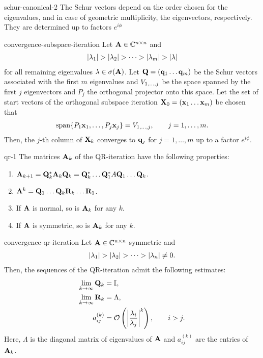 \begin{Lemma}{schur-canonical-2}
  The Schur vectors depend on the order chosen for the eigenvalues,
  and in case of geometric multiplicity, the eigenvectors,
  respectively. They are determined up to factors $e^{i\phi}$
\end{Lemma}

\begin{Theorem}{convergence-subspace-iteration}
  Let $\mata\in\Cnn$ and
  \begin{gather}
    \abs{\lambda_1} >
    \abs{\lambda_2}>\dots>\abs{\lambda_m}>\abs{\lambda}
  \end{gather}
  for all
  remaining eigenvalues $\lambda\in\sigma(\mata)$. Let
  $\matq = (\vq_1\dots\vq_m)$ be the Schur vectors associated with the
  first $m$ eigenvalues and $\esp{1,\dots,j}$ be the space spanned by
  the first $j$ eigenvectors and $P_j$ the orthogonal projector
  onto this space. Let the set of start vectors of the orthogonal subspace iteration
  $\matx_0 = (\vx_1\dots\vx_m)$ be chosen that
  \begin{gather}
    \operatorname{span}\{P_1 \vx_1,\dots,P_j\vx_j\} = \esp{1,\dots,j},\qquad j=1,\dots,m.
  \end{gather}
  Then, the $j$-th column of $\matx_k$ converges to $\vq_j$ for $j=1,\dots,m$ up to a factor $e^{i\phi}$.
\end{Theorem}

\begin{Lemma}{qr-1}
  The matrices $\mata_k$ of the QR-iteration have the following properties:
  \begin{enumerate}
  \item $\mata_{k+1} = \matq_k^*\mata_k\matq_k = \matq_k^*\dots\matq_1^*A\matq_1\dots\matq_k$.
  \item $\mata^k=\matq_1\dots\matq_k\matr_k\dots\matr_1$.
  \item If $\mata$ is normal, so is $\mata_k$ for any $k$.
  \item If $\mata$ is symmetric, so is $\mata_k$ for any $k$.
  \end{enumerate}
\end{Lemma}

\begin{Theorem}{convergence-qr-iteration}
  Let $\mata\in\Cnn$ symmetric and
  \begin{gather}
    \abs{\lambda_1} >
    \abs{\lambda_2}>\dots>\abs{\lambda_n} \neq 0.
  \end{gather}
  Then, the sequences of the QR-iteration admit the following estimates:
  \begin{align}
    \lim_{k\to\infty} \matq_k &= \id,\\
    \lim_{k\to\infty} \matr_k &= \Lambda,\\
    a_{ij}^{(k)} &= \bigo \left(\abs*{\frac{\lambda_i}{\lambda_j}}^k\right),
                   \qquad i>j.
  \end{align}
  Here, $\Lambda$ is the diagonal matrix of eigenvalues of $\mata$ and
  $a_{ij}^{(k)}$ are the entries of $\mata_k$.
\end{Theorem}

